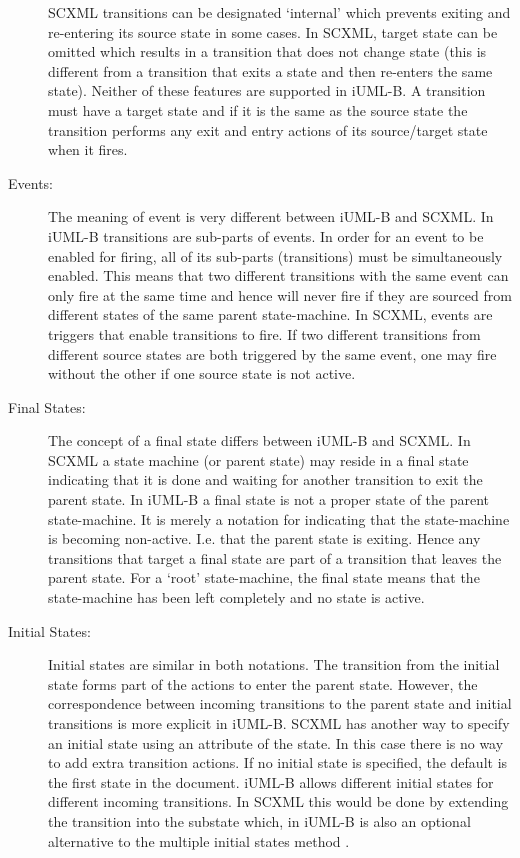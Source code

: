 \begin{description}
SCXML transitions can be designated `internal' which prevents exiting and re-entering its source state in some cases.
 In SCXML, target state can be omitted which results in a transition that does not change state (this is different from a transition that exits a state and then re-enters the same state).
Neither of these features are supported in iUML-B. A transition must have a target state and if it is the same as the source state the transition performs any exit and entry actions of its source/target state when it fires.

\item [Events:]
The meaning of event is very different between iUML-B and SCXML.
 In iUML-B transitions are sub-parts of events. 
 In order for an event to be enabled for firing, all of its sub-parts (transitions) must be simultaneously enabled. 
 This means that two different transitions with the same event can only fire at the same time and hence will never fire if they are sourced from different states of the same parent state-machine. 
In SCXML, events are triggers that enable transitions to fire. 
If two different transitions from different source states are both triggered by the same event, one may fire without the other if one source state is not active.

\item [Final States:]
The concept of a final state differs between iUML-B and SCXML. 
In SCXML a state machine (or parent state) may reside in a final state indicating that it is done and waiting for another transition to exit the parent state. 
 In iUML-B a final state is not a proper state of the parent state-machine. 
 It is merely a notation for indicating that the state-machine is becoming non-active. I.e. that the parent state is exiting. 
 Hence any transitions that target a final state are part of a transition that leaves the parent state. 
 For a `root'  state-machine, the final state means that the state-machine has been left completely and no state is active.

\item [Initial States:]
Initial states are similar in both notations. 
The transition from the initial state forms part of the actions to enter the parent state. 
However, the correspondence between incoming transitions to the parent state and initial transitions is more explicit in iUML-B. 
SCXML has another way to specify an initial state using an attribute of the state.
 In this case there is no way to add extra transition actions.
If no initial state is specified, the default is the first state in the document.
iUML-B allows different initial states for different incoming transitions. 
In SCXML this would be done by extending the transition into the substate which, in iUML-B is also an optional alternative to the multiple initial states method .


\end{description}
